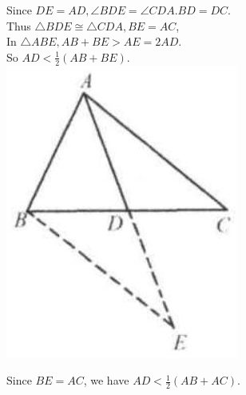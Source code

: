 \documentclass{article}
\begin{document}
Since \(D E=A D, \angle B D E=\angle C D A . B D=D C\).\\
Thus \(\triangle B D E \cong \triangle C D A, B E=A C\),\\
In \(\triangle A B E, A B+B E>A E=2 A D\).\\
So \(A D<\frac{1}{2}(A B+B E)\).\\
\centering
\includegraphics[width=\textwidth]{images/023(2).jpg}

Since \(B E=A C\), we have \(A D<\frac{1}{2}(A B+A C)\).
\end{document}
